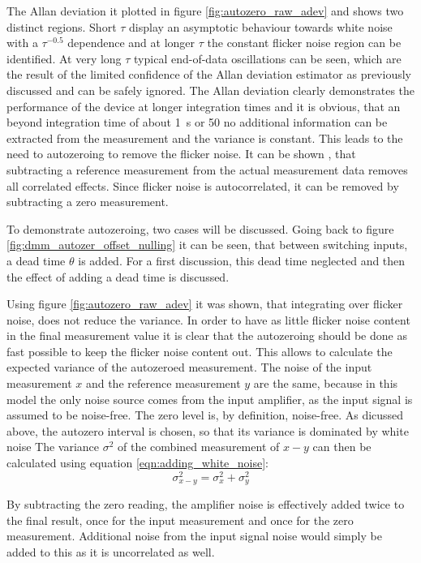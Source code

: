 The Allan deviation it plotted in figure \ref{fig:autozero_raw_adev} and shows two distinct regions. Short $\tau$ display an asymptotic behaviour towards white noise with a $\tau^{−0.5}$ dependence and at longer $\tau$ the constant flicker noise region can be identified. At very long $\tau$ typical end-of-data oscillations can be seen, which are the result of the limited confidence of the Allan deviation estimator as previously discussed and can be safely ignored. The Allan deviation clearly demonstrates the performance of the device at longer integration times and it is obvious, that an beyond integration time of about \qty{1}{\second} or \qty{50}{\plc} no additional information can be extracted from the measurement and the variance is constant. This leads to the need to autozeroing to remove the flicker noise. It can be shown \cite{autozero_with_dead_time}, that subtracting a reference measurement from the actual measurement data removes all correlated effects. Since flicker noise is autocorrelated, it can be removed by subtracting a zero measurement.

To demonstrate autozeroing, two cases will be discussed. Going back to figure \ref{fig:dmm_autozer_offset_nulling} it can be seen, that between switching inputs, a dead time $\theta$ is added. For a first discussion, this dead time neglected and then the effect of adding a dead time is discussed.

Using figure \ref{fig:autozero_raw_adev} it was shown, that integrating over flicker noise, does not reduce the variance. In order to have as little flicker noise content in the final measurement value it is clear that the autozeroing should be done as fast possible to keep the flicker noise content out. This allows to calculate the expected variance of the autozeroed measurement. The noise of the input measurement $x$ and the reference measurement $y$ are the same, because in this model the only noise source comes from the input amplifier, as the input signal is assumed to be noise-free. The zero level is, by definition, noise-free. As dicussed above, the autozero interval is chosen, so that its variance is dominated by white noise The variance $\sigma^2$ of the combined measurement of $x-y$ can then be calculated using equation \ref{eqn:adding_white_noise}:
\begin{equation}
    \sigma_{x-y}^2 = \sigma_x^2 + \sigma_y^2 \label{eqn:autozeroing}
\end{equation}

By subtracting the zero reading, the amplifier noise is effectively added twice to the final result, once for the input measurement and once for the zero measurement. Additional noise from the input signal noise would simply be added to this as it is uncorrelated as well.

